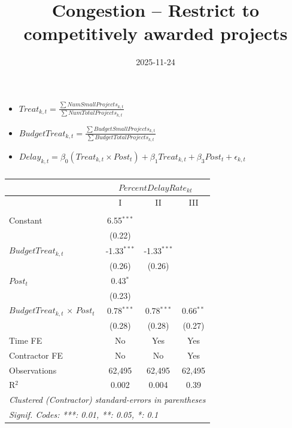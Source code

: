 \documentclass[
]{article}
\title{Congestion -- Restrict to competitively awarded projects}
\author{}
\date{\vspace{-2.5em}2025-11-24}
\providecommand{\tightlist}{%
  \setlength{\itemsep}{0pt}\setlength{\parskip}{0pt}}
\begin{document}
\maketitle

\begin{itemize}
\tightlist
\item
  \(Treat_{k,t} = \frac{\sum Num Small Projects_{k,t}}{\sum Num Total Projects_{k,t}}\)
\item
  \(BudgetTreat_{k,t} = \frac{\sum Budget Small Projects_{k,t}}{\sum Budget Total Projects_{k,t}}\)
\item
  \(Delay_{k,t} = \beta_0 (Treat_{k,t} \times Post_t) + \beta_1 Treat_{k,t} + \beta_3 Post_t + \epsilon_{k,t}\)
\end{itemize}

\begin{table}[htbp]
   \caption{}
   \centering
   \begin{tabular}{lccc}
      \toprule
      \midrule  & \multicolumn{3}{c}{$PercentDelayRate_{kt}$}\\
      \midrule  & I & II & III\\
      \midrule \\
      Constant                               & 6.55$^{***}$  &               &   \\   
                                             & (0.22)        &               &   \\   
      $BudgetTreat_{k,t}$                    & -1.33$^{***}$ & -1.33$^{***}$ &   \\   
                                             & (0.26)        & (0.26)        &   \\   
      $Post_t$                               & 0.43$^{*}$    &               &   \\   
                                             & (0.23)        &               &   \\   
      $BudgetTreat_{k,t}$ $\times$ $Post_t$  & 0.78$^{***}$  & 0.78$^{***}$  & 0.66$^{**}$\\   
                                             & (0.28)        & (0.28)        & (0.27)\\   
      \midrule 
      Time FE                                & No            & Yes           & Yes\\  
      Contractor FE                          & No            & No            & Yes\\  
      Observations                           & 62,495        & 62,495        & 62,495\\  
      R$^2$                                  & 0.002         & 0.004         & 0.39\\  
      \midrule
      \multicolumn{4}{l}{\emph{Clustered (Contractor) standard-errors in parentheses}}\\
      \multicolumn{4}{l}{\emph{Signif. Codes: ***: 0.01, **: 0.05, *: 0.1}}\\
   \end{tabular}
\end{table}
\end{document}
